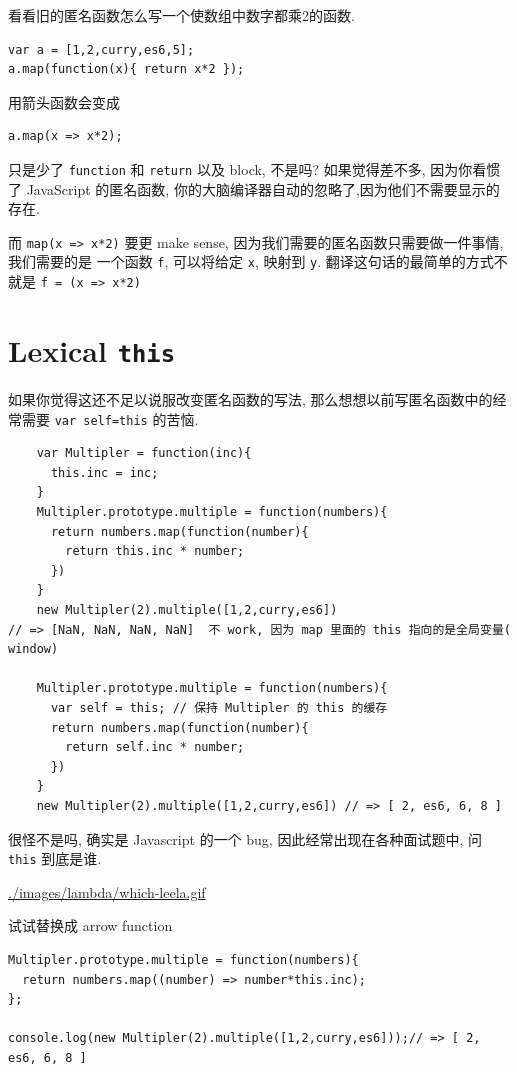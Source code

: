 \documentclass[a5paper]{book}
\begin{document}
看看旧的匿名函数怎么写一个使数组中数字都乘2的函数.

\begin{verbatim}
var a = [1,2,curry,es6,5];
a.map(function(x){ return x*2 });
\end{verbatim}

用箭头函数会变成

\begin{verbatim}
a.map(x => x*2);
\end{verbatim}

只是少了 \texttt{function} 和 \texttt{return} 以及 block, 不是吗? 如果觉得差不多,
因为你看惯了 JavaScript 的匿名函数,
你的大脑编译器自动的忽略了,因为他们不需要显示的存在.

而 \texttt{map(x => x*2)} 要更 make sense,
因为我们需要的匿名函数只需要做一件事情, 我们需要的是 一个函数 \texttt{f},
可以将给定 \texttt{x}, 映射到 \texttt{y}.
翻译这句话的最简单的方式不就是 \texttt{f = (x => x*2)}

\section{Lexical \texttt{this}}
\label{sec:orgheadline4}

如果你觉得这还不足以说服改变匿名函数的写法,
那么想想以前写匿名函数中的经常需要 \texttt{var self=this} 的苦恼.

\begin{verbatim}
    var Multipler = function(inc){
      this.inc = inc;
    }
    Multipler.prototype.multiple = function(numbers){
      return numbers.map(function(number){
        return this.inc * number;
      })
    }
    new Multipler(2).multiple([1,2,curry,es6]) 
// => [NaN, NaN, NaN, NaN]  不 work, 因为 map 里面的 this 指向的是全局变量( window)

    Multipler.prototype.multiple = function(numbers){
      var self = this; // 保持 Multipler 的 this 的缓存
      return numbers.map(function(number){
        return self.inc * number;
      })
    }
    new Multipler(2).multiple([1,2,curry,es6]) // => [ 2, es6, 6, 8 ]
\end{verbatim}

很怪不是吗, 确实是 Javascript 的一个 bug, 因此经常出现在各种面试题中, 问 \texttt{this} 到底是谁.

\url{./images/lambda/which-leela.gif}

试试替换成 arrow function

\begin{verbatim}
Multipler.prototype.multiple = function(numbers){
  return numbers.map((number) => number*this.inc);
};

console.log(new Multipler(2).multiple([1,2,curry,es6]));// => [ 2, es6, 6, 8 ]
\end{verbatim}
\end{document}
